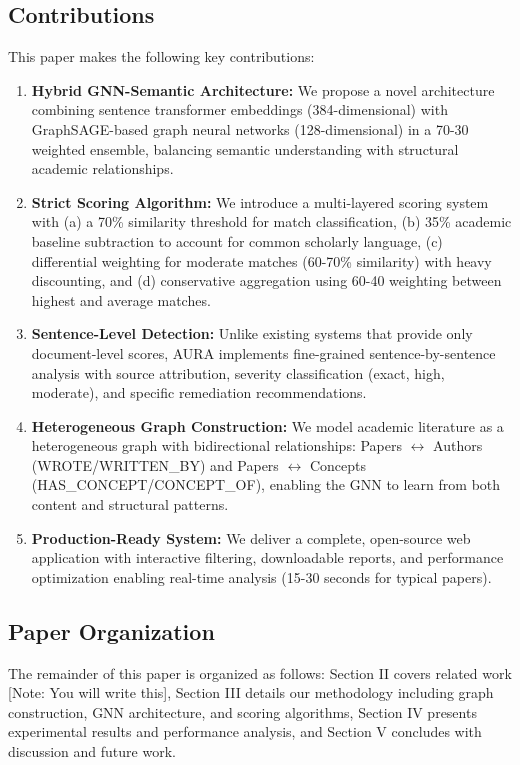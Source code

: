 \documentclass[conference]{IEEEtran}
\begin{document}
\subsection{Contributions}
This paper makes the following key contributions:

\begin{enumerate}
    \item \textbf{Hybrid GNN-Semantic Architecture:} We propose a novel architecture combining sentence transformer embeddings (384-dimensional) with GraphSAGE-based graph neural networks (128-dimensional) in a 70-30 weighted ensemble, balancing semantic understanding with structural academic relationships.
    
    \item \textbf{Strict Scoring Algorithm:} We introduce a multi-layered scoring system with (a) a 70\% similarity threshold for match classification, (b) 35\% academic baseline subtraction to account for common scholarly language, (c) differential weighting for moderate matches (60-70\% similarity) with heavy discounting, and (d) conservative aggregation using 60-40 weighting between highest and average matches.
    
    \item \textbf{Sentence-Level Detection:} Unlike existing systems that provide only document-level scores, AURA implements fine-grained sentence-by-sentence analysis with source attribution, severity classification (exact, high, moderate), and specific remediation recommendations.
    
    \item \textbf{Heterogeneous Graph Construction:} We model academic literature as a heterogeneous graph with bidirectional relationships: Papers $\leftrightarrow$ Authors (WROTE/WRITTEN\_BY) and Papers $\leftrightarrow$ Concepts (HAS\_CONCEPT/CONCEPT\_OF), enabling the GNN to learn from both content and structural patterns.
    
    \item \textbf{Production-Ready System:} We deliver a complete, open-source web application with interactive filtering, downloadable reports, and performance optimization enabling real-time analysis (15-30 seconds for typical papers).
\end{enumerate}

\subsection{Paper Organization}
The remainder of this paper is organized as follows: Section II covers related work [Note: You will write this], Section III details our methodology including graph construction, GNN architecture, and scoring algorithms, Section IV presents experimental results and performance analysis, and Section V concludes with discussion and future work.
\end{document}

